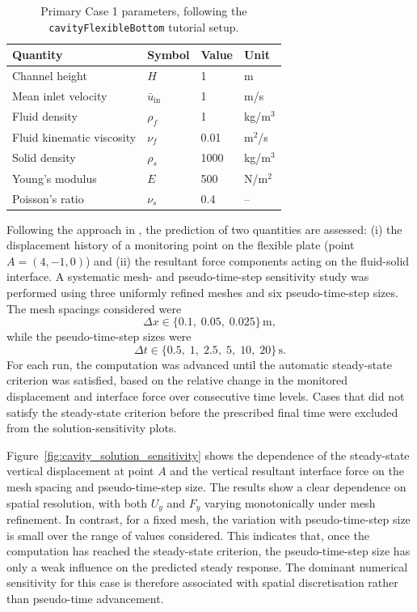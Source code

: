 \begin{table}[htbp]
	\centering
	\begin{tabular}{llll}
		\hline
		Quantity & Symbol & Value & Unit \\
		\hline
		Channel height & $H$ & 1 & m \\
		Mean inlet velocity & $\bar{u}_{\mathrm{in}}$ & 1 & m/s \\
		Fluid density & $\rho_f$ & 1 & kg/m$^3$ \\
		Fluid kinematic viscosity & $\nu_f$ & 0.01 & m$^2$/s \\
		Solid density & $\rho_s$ & 1000 & kg/m$^3$ \\
		Young's modulus & $E$ & 500 & N/m$^2$ \\
		Poisson's ratio & $\nu_s$ & 0.4 & -- \\
		\hline
	\end{tabular}
	\caption{Primary Case 1 parameters, following the \texttt{cavityFlexibleBottom} tutorial setup.}
	\label{tab:case1_parameters}
\end{table}

Following the approach in \citep{Tukovic2018}, the prediction of two quantities are assessed: (i) the displacement history of a monitoring point on the flexible plate (point $A=(4,-1,0)$) and (ii) the resultant force components acting on the fluid-solid interface. 
A systematic mesh- and pseudo-time-step sensitivity study was performed using three uniformly refined meshes and six pseudo-time-step sizes. The mesh spacings considered were
\[
    \Delta x \in \{0.1,\;0.05,\;0.025\}\,\mathrm{m},
\]
while the pseudo-time-step sizes were
\[
    \Delta t \in \{0.5,\;1,\;2.5,\;5,\;10,\;20\}\,\mathrm{s}.
\]
For each run, the computation was advanced until the automatic steady-state criterion was satisfied, based on the relative change in the monitored displacement and interface force over consecutive time levels. Cases that did not satisfy the steady-state criterion before the prescribed final time were excluded from the solution-sensitivity plots.

Figure~\ref{fig:cavity_solution_sensitivity} shows the dependence of the steady-state vertical displacement at point $A$ and the vertical resultant interface force on the mesh spacing and pseudo-time-step size. The results show a clear dependence on spatial resolution, with both $U_y$ and $F_y$ varying monotonically under mesh refinement. In contrast, for a fixed mesh, the variation with pseudo-time-step size is small over the range of values considered. This indicates that, once the computation has reached the steady-state criterion, the pseudo-time-step size has only a weak influence on the predicted steady response. The dominant numerical sensitivity for this case is therefore associated with spatial discretisation rather than pseudo-time advancement.

